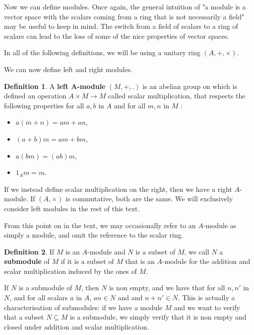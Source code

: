 \documentclass{report}
\theoremstyle{definition}
\newtheorem{defin}{Definition}
\theoremstyle{remark}
\begin{document}
 Now we can define modules. Once again, the general intuition of "a module is a vector space with the scalars coming from a ring that is not necessarily a field" may be useful to keep in mind. The switch from a field of scalars to a ring of scalars can lead to the loss of some of the nice properties of vector spaces. 
 
 \bigskip
 In all of the following definitions, we will be using a unitary ring $(A,+,\times)$.
 \bigskip
 
 We can now define left and right modules. 
 
 \begin{defin}
    A \textbf{left A-module} $(M,+,.)$ is an abelian group on which is defined an operation $A \times M \longrightarrow M$ called scalar multiplication, that respects the following properties for all $a,b$ in $A$ and for all $m,n$ in $M$ :
    \begin{itemize}
        \item $a(m + n) = am + an$,
        \item $(a + b)m = am + bm$,
        \item $a(bm) = (ab)m$,
        \item $1_Am = m$.
    \end{itemize}
 \end{defin}
 
  If we instead define scalar multiplication on the right, then we have a right $A$-module.  If $(A,\times)$ is commutative, both are the same. We will exclusively consider left modules in the rest of this text. 
  
  
 From this point on in the text, we may occasionally refer to an $A$-module as simply a module, and omit the reference to the scalar ring.
 
  
  \begin{defin} 
  
   If $M$ is an $A$-module and $N$ is a subset of $M$, we call $N$ a \textbf{submodule} of $M$ if it is a subset of $M$ that is an $A$-module for the addition and scalar multiplication induced by the ones of $M$.
  \end{defin}
  
  If $N$ is a submodule of $M$, then $N$ is non empty, and we have that for all $n,n'$ in $N$, and for all scalars $a$ in $A$, $an\in N$ and and $n + n'\in N$. This is actually a characterisation of submodules: if we have a module $M$ and we want to verify that a subset $N \subseteq M$ is a submodule, we simply verify that it is non empty and closed under addition and scalar multiplication. 
  
\end{document}
